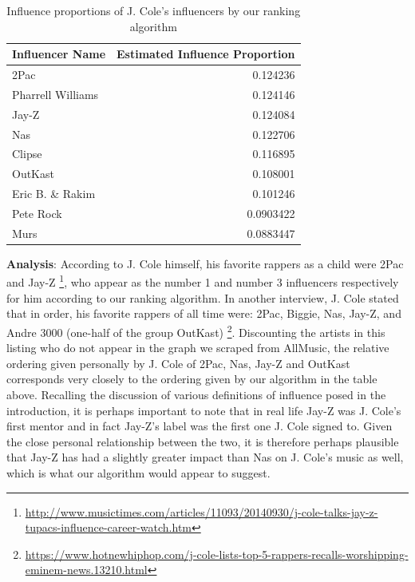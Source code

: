 \begin{table}[H]
\centering
\caption{Influence proportions of J. Cole's influencers by our ranking algorithm}
\begin{tabular}{lr}
\hline
 Influencer Name   &   Estimated Influence Proportion \\
\hline
 2Pac              &                        0.124236  \\
 Pharrell Williams &                        0.124146  \\
 Jay-Z             &                        0.124084  \\
 Nas               &                        0.122706  \\
 Clipse            &                        0.116895  \\
 OutKast           &                        0.108001  \\
 Eric B. \& Rakim   &                        0.101246  \\
 Pete Rock         &                        0.0903422 \\
 Murs              &                        0.0883447 \\
\hline
\end{tabular}
\end{table}

\textbf{Analysis}: According to J. Cole himself, his favorite rappers as a child were 2Pac and Jay-Z \footnote{\url{http://www.musictimes.com/articles/11093/20140930/j-cole-talks-jay-z-tupacs-influence-career-watch.htm}}, who appear as the number 1 and number 3 influencers respectively for him according to our ranking algorithm. In another interview, J. Cole stated that in order, his favorite rappers of all time were: 2Pac, Biggie, Nas, Jay-Z, and Andre 3000 (one-half of the group OutKast) \footnote{\url{https://www.hotnewhiphop.com/j-cole-lists-top-5-rappers-recalls-worshipping-eminem-news.13210.html}}. Discounting the artists in this listing who do not appear in the graph we scraped from AllMusic, the relative ordering given personally by J. Cole of 2Pac, Nas, Jay-Z and OutKast corresponds very closely to the ordering given by our algorithm in the table above. Recalling the discussion of various definitions of influence posed in the introduction, it is perhaps important to note that in real life Jay-Z was J. Cole's first mentor and in fact Jay-Z's label was the first one J. Cole signed to. Given the close personal relationship between the two, it is therefore perhaps plausible that Jay-Z has had a slightly greater impact than Nas on J. Cole's music as well, which is what our algorithm would appear to suggest.

